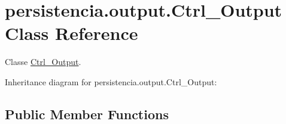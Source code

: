 \hypertarget{classpersistencia_1_1output_1_1Ctrl__Output}{}\section{persistencia.\+output.\+Ctrl\+\_\+\+Output Class Reference}
\label{classpersistencia_1_1output_1_1Ctrl__Output}


Classe \hyperlink{classpersistencia_1_1output_1_1Ctrl__Output}{Ctrl\+\_\+\+Output}.  




Inheritance diagram for persistencia.\+output.\+Ctrl\+\_\+\+Output\+:
\subsection*{Public Member Functions}

